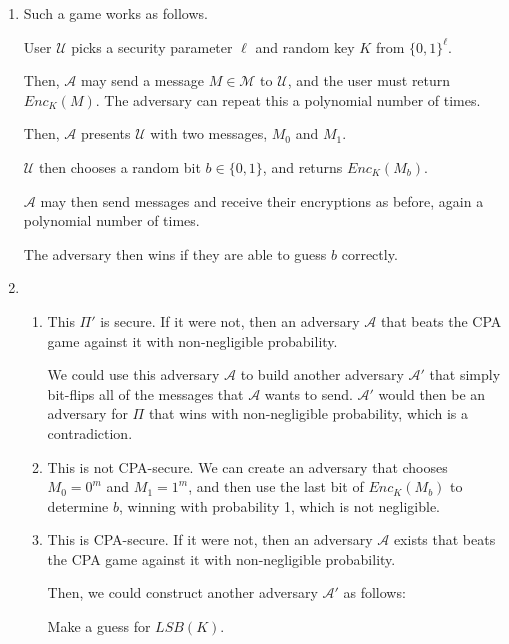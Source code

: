


\begin{enumerate}[label=(\alph*)]
  \item

    Such a game works as follows.

    User $\mathcal{U}$ picks a security parameter $\ell$ and random key $K$ from $\{0,1\}^\ell$.

    Then, $\mathcal{A}$ may send a message $M \in \mathcal{M}$ to $\mathcal{U}$, and the user must return $Enc_K(M)$. The adversary can repeat this a polynomial number of times.

    Then, $\mathcal{A}$ presents $\mathcal{U}$ with two messages, $M_0$ and $M_1$.

    $\mathcal{U}$ then chooses a random bit $b \in \{0,1\}$, and returns $Enc_K(M_b)$.

    $\mathcal{A}$ may then send messages and receive their encryptions as before, again a polynomial number of times.

    The adversary then wins if they are able to guess $b$ correctly.

  \item
    \begin{enumerate}[label=(\roman*)]
      \item This $\Pi'$ is secure. If it were not, then an adversary $\mathcal{A}$ that beats the CPA game against it with non-negligible probability.

        We could use this adversary $\mathcal{A}$ to build another adversary $\mathcal{A'}$ that simply bit-flips all of the messages that $\mathcal{A}$ wants to send. $\mathcal{A'}$ would then be an adversary for $\Pi$ that wins with non-negligible probability, which is a contradiction.

      \item
        This is not CPA-secure. We can create an adversary that chooses $M_0 = 0^m$ and $M_1 = 1^m$, and then use the last bit of $Enc_K(M_b)$ to determine $b$, winning with probability 1, which is not negligible.

      \item
        This is CPA-secure. If it were not, then an adversary $\mathcal{A}$ exists that beats the CPA game against it with non-negligible probability.

        Then, we could construct another adversary $\mathcal{A'}$ as follows:

        Make a guess for $LSB(K)$.


\end{enumerate}
\end{enumerate}
